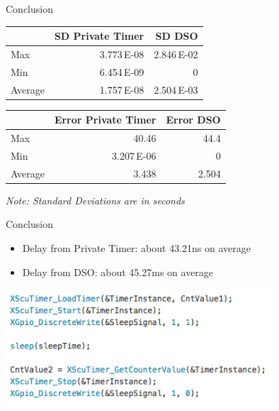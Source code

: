\documentclass[pdf]{beamer}
\begin{document}
\begin{frame}{Conclusion}
  \begin{center}
    \begin{tabular}{lrr}
      & SD Private Timer & SD DSO\\
      \hline
      Max & 3.773\,E-08 & 2.846\,E-02\\
      Min & 6.454\,E-09 & 0\\
      Average & 1.757\,E-08 & 2.504\,E-03\\
      \hline
    \end{tabular}
  \end{center}

  \begin{center}
    \begin{tabular}{lrr}
      & Error Private Timer & Error DSO\\
      \hline
      Max & 40.46 & 44.4\\
      Min & 3.207\,E-06 & 0\\
      Average & 3.438 & 2.504\\
      \hline
    \end{tabular}
  \end{center}
  \center\small\emph{Note: Standard Deviations are in seconds}

\end{frame}

\begin{frame}{Conclusion}

  \begin{itemize}

  \item Delay from Private Timer: about 43.21ns on average

  \item Delay from DSO: about 45.27ms on average

  \end{itemize}

  \pause

  \centering
  \includegraphics[width=100mm]{code.png}


\end{frame}

\begin{frame}



\end{frame}
\end{document}
